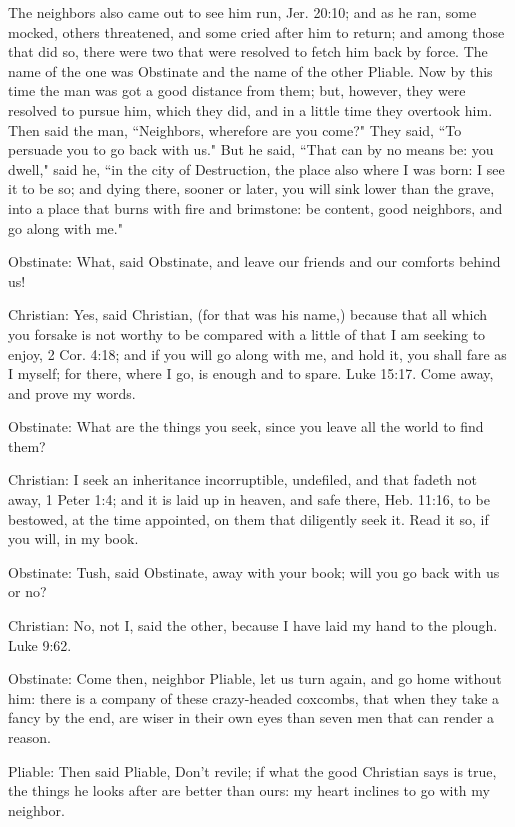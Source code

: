 The neighbors also came out to see him run, Jer. 20:10; and as he ran, some mocked, others threatened, and some cried after him to return; and among those that did so, there were two that were resolved to fetch him back by force. The name of the one was Obstinate and the name of the other Pliable. Now by this time the man was got a good distance from them; but, however, they were resolved to pursue him, which they did, and in a little time they overtook him. Then said the man, ``Neighbors, wherefore are you come?" They said, ``To persuade you to go back with us." But he said, ``That can by no means be: you dwell," said he, ``in the city of Destruction, the place also where I was born: I see it to be so; and dying there, sooner or later, you will sink lower than the grave, into a place that burns with fire and brimstone: be content, good neighbors, and go along with me." 

Obstinate: What, said Obstinate, and leave our friends and our comforts behind us! 

Christian: Yes, said Christian, (for that was his name,) because that all which you forsake is not worthy to be compared with a little of that I am seeking to enjoy, 2 Cor. 4:18; and if you will go along with me, and hold it, you shall fare as I myself; for there, where I go, is enough and to spare. Luke 15:17. Come away, and prove my words. 

Obstinate: What are the things you seek, since you leave all the world to find them? 

Christian: I seek an inheritance incorruptible, undefiled, and that fadeth not away, 1 Peter 1:4; and it is laid up in heaven, and safe there, Heb. 11:16, to be bestowed, at the time appointed, on them that diligently seek it. Read it so, if you will, in my book. 

Obstinate: Tush, said Obstinate, away with your book; will you go back with us or no? 

Christian: No, not I, said the other, because I have laid my hand to the plough. Luke 9:62. 

Obstinate: Come then, neighbor Pliable, let us turn again, and go home without him: there is a company of these crazy-headed coxcombs, that when they take a fancy by the end, are wiser in their own eyes than seven men that can render a reason. 

Pliable: Then said Pliable, Don't revile; if what the good Christian says is true, the things he looks after are better than ours: my heart inclines to go with my neighbor. 

